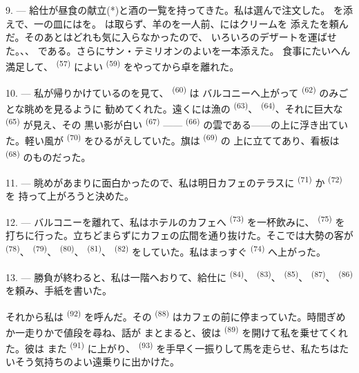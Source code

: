 
\VUsaut{4.0mm}
\VUsaut{3.0mm}

9. --- 給仕が昼食の献立(*)と酒の一覧を持ってきた。私は選んで注文した。
を添えで、一の皿にはを。
は取らず、羊のを一人前、にはクリームを
添えたを頼んだ。そのあとはどれも気に入らなかったので、
いろいろのデザートを運ばせた。、、
である。さらにサン・テミリオンのよいを一本添えた。
食事にたいへん満足して、 \textsuperscript{(57)} によい
\textsuperscript{(59)} をやってから卓を離れた。

10. --- 私が帰りかけているのを見て、 \textsuperscript{(60)} は
バルコニーへ上がって \textsuperscript{(62)} のみごとな眺めを見るように
勧めてくれた。遠くには漁の \textsuperscript{(63)}、
\textsuperscript{(64)}、それに巨大な \textsuperscript{(65)} が見え、その
黒い影が白い \textsuperscript{(67)} ——
\textsuperscript{(66)} の雲である——の上に浮き出ていた。軽い風が
\textsuperscript{(70)} をひるがえしていた。旗は \textsuperscript{(69)} の
上に立ててあり、看板は \textsuperscript{(68)} のものだった。

\VUsaut{3.0mm}
\VUsaut{3.0mm}

11. --- 眺めがあまりに面白かったので、私は明日カフェのテラスに
 \textsuperscript{(71)} か \textsuperscript{(72)} を
持って上がろうと決めた。

12. --- バルコニーを離れて、私はホテルのカフェへ
\textsuperscript{(73)} を一杯飲みに、 \textsuperscript{(75)} を
打ちに行った。立ちどまらずにカフェの広間を通り抜けた。そこでは大勢の客が
 \textsuperscript{(78)}、 \textsuperscript{(79)}、
 \textsuperscript{(80)}、 \textsuperscript{(81)}、
 \textsuperscript{(82)} をしていた。私はまっすぐ
\textsuperscript{(74)} へ上がった。

13. --- 勝負が終わると、私は一階へおりて、給仕に
\textsuperscript{(84)}、 \textsuperscript{(83)}、
\textsuperscript{(85)}、 \textsuperscript{(87)}、
\textsuperscript{(86)} を頼み、手紙を書いた。

それから私は \textsuperscript{(92)} を呼んだ。その
\textsuperscript{(88)} はカフェの前に停まっていた。時間ぎめか一走りかで値段を尋ね、話が
まとまると、彼は \textsuperscript{(89)} を開けて私を乗せてくれた。彼は
また \textsuperscript{(91)} に上がり、 \textsuperscript{(93)}
を手早く一振りして馬を走らせ、私たちはたいそう気持ちのよい遠乗りに出かけた。
\VUsaut{6.0mm}
\VUfilet{22mm}
